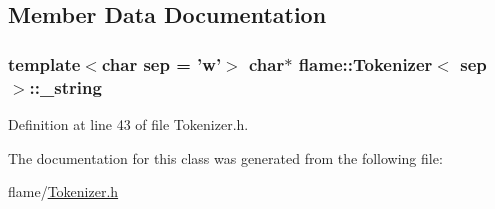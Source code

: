 \subsection{Member Data Documentation}
\hypertarget{classflame_1_1_tokenizer_aec4188ffcf47e418b5d6257706aa7067}{
\subsubsection[{\-\_\-string}]{\setlength{\rightskip}{0pt plus 5cm}template$<$char sep = 'w'$>$ char$\ast$ {\bf flame\-::\-Tokenizer}$<$ sep $>$\-::\-\_\-string\hspace{0.3cm}{\ttfamily [protected]}}}\label{classflame_1_1_tokenizer_aec4188ffcf47e418b5d6257706aa7067}


Definition at line 43 of file Tokenizer.\-h.



The documentation for this class was generated from the following file\-:\begin{DoxyCompactItemize}
\item 
flame/\hyperlink{_tokenizer_8h}{Tokenizer.\-h}\end{DoxyCompactItemize}
